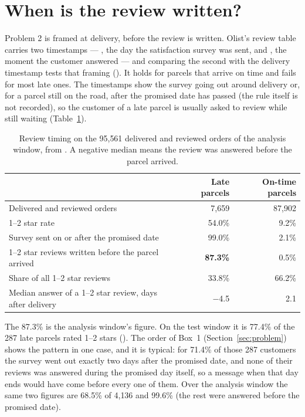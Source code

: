 \section{When is the review written?}
\label{app:timing}

Problem 2 is framed at delivery, before the review is written. Olist's review
table carries two timestamps --- , the day the
satisfaction survey was sent, and , the moment
the customer answered --- and comparing the second with the delivery timestamp
tests that framing (). It holds for parcels that
arrive on time and fails for most late ones. The timestamps show the survey
going out around delivery or, for a parcel still on the road, after the promised
date has passed (the rule itself is not recorded), so the customer of a late
parcel is usually asked to review while still waiting (Table~\ref{tab:timing}).

\begin{table}[htbp]
\centering
\caption{Review timing on the 95{,}561 delivered and reviewed orders of the
analysis window, from . A negative median
means the review was answered before the parcel arrived.}
\label{tab:timing}
\small
\begin{tabular}{@{}lrr@{}}
\toprule
 & \textbf{Late parcels} & \textbf{On-time parcels} \\
\midrule
Delivered and reviewed orders & 7{,}659 & 87{,}902 \\
1--2 star rate & 54.0\% & 9.2\% \\
Survey sent on or after the promised date & 99.0\% & 2.1\% \\
1--2 star reviews written before the parcel arrived & \textbf{87.3\%} & 0.5\% \\
Share of all 1--2 star reviews & 33.8\% & 66.2\% \\
Median answer of a 1--2 star review, days after delivery & $-$4.5 & 2.1 \\
\bottomrule
\end{tabular}
\end{table}

The 87.3\% is the analysis window's figure. On the test window it is 77.4\% of
the 287 late parcels rated 1--2 stars (). The
order of Box~1 (Section~\ref{sec:problem}) shows the pattern in one case, and it
is typical: for 71.4\% of those 287 customers the survey went out exactly two
days after the promised date, and none of their reviews was answered during the
promised day itself, so a message when that day ends would have come before
every one of them. Over the analysis window the same two figures are 68.5\% of
4{,}136 and 99.6\% (the rest were answered before the promised date).

